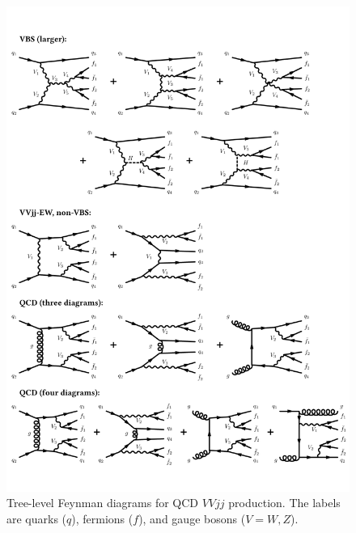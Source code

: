 \begin{figure}[htbp]
  \centering
    \includegraphics[width=\textwidth]{figs/ssww_13tev/diagrams/VbsQCD}
  \caption{Tree-level Feynman diagrams for QCD $VVjj$ production.  The labels are quarks ($q$), fermions ($f$), and gauge bosons ($V = W,Z$).}
  \label{fig:ssww13tev_diagrams_qcd}
\end{figure}

